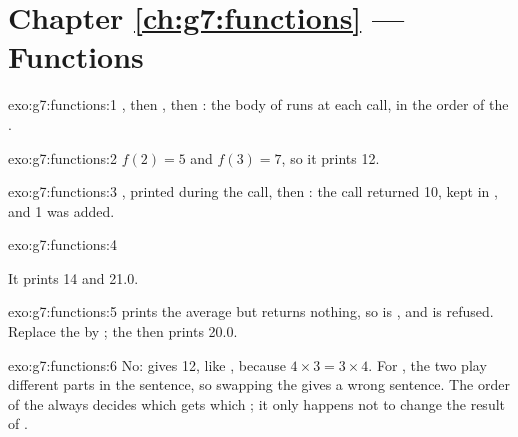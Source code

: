 \section*{Chapter \ref{ch:g7:functions} --- Functions}

\begin{solution}{exo:g7:functions:1}
, then , then : the body of 
runs at each call, in the order of the .
\end{solution}

\begin{solution}{exo:g7:functions:2}
$f(2) = 5$ and $f(3) = 7$, so it prints 12.
\end{solution}

\begin{solution}{exo:g7:functions:3}
, printed during the call, then : the call returned
10, kept in , and 1 was added.
\end{solution}

\begin{solution}{exo:g7:functions:4}
\label{lst:g7:functions:sol-perimeter}

It prints 14 and 21.0.
\end{solution}

\begin{solution}{exo:g7:functions:5}
 prints the average but returns nothing, so 
is , and  is refused. Replace the  by
; the  then prints 20.0.
\end{solution}

\begin{solution}{exo:g7:functions:6}
No:  gives 12, like , because $4 \times 3 = 3
\times 4$. For , the two  play different parts in the
sentence, so swapping the  gives a wrong sentence. The order of the
 always decides which  gets which ; it only happens not
to change the result of .
\end{solution}

